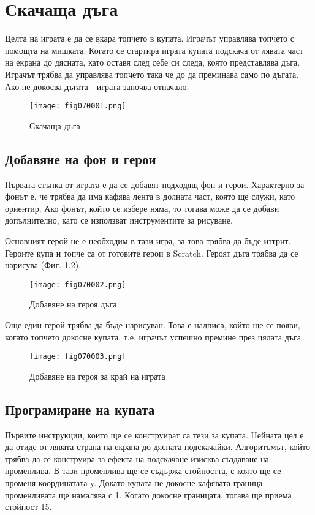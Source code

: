 \chapter{Скачаща дъга}

Целта на играта е да се вкара топчето в купата. Играчът управлява топчето с помощта на мишката. Когато се стартира играта купата подскача от лявата част на екрана до дясната, като оставя след себе си следа, която представлява дъга. Играчът трябва да управлява топчето така че до да преминава само по дъгата. Ако не докосва дъгата - играта започва отначало.

\begin{figure}[H]
  \centering
  \texttt{[image: fig070001.png]}
  \caption{Скачаща дъга}
\label{fig070001}
\end{figure}

\section{Добавяне на фон и герои}
Първата стъпка от играта е да се добавят подходящ фон и герои. Характерно за фонът е, че трябва да има кафява лента в долната част, която ще служи, като ориентир. Ако фонът, който се избере няма, то тогава може да се добави допълнително, като се използват инструментите за рисуване.

Основният герой не е необходим в тази игра, за това трябва да бъде изтрит. Героите купа и топче са от готовите герои в Scratch. Героят дъга трябва да се нарисува (Фиг. \ref{fig070002}).

\begin{figure}[H]
  \centering
  \texttt{[image: fig070002.png]}
  \caption{Добавяне на героя дъга}
\label{fig070002}
\end{figure}

Още един герой трябва да бъде нарисуван. Това е надписа, който ще се появи, когато топчето докосне купата, т.е. играчът успешно премине през цялата дъга.

\begin{figure}[H]
  \centering
  \texttt{[image: fig070003.png]}
  \caption{Добавяне на героя за край на играта}
\label{fig070003}
\end{figure}

\section{Програмиране на купата}
Първите инструкции, които ще се конструират са тези за купата. Нейната цел е да отиде от лявата страна на екрана до дясната подскачайки. Алгоритъмът, който трябва да се конструира за ефекта на подскачане изисква създаване на променлива. В тази променлива ще се съдържа стойността, с която ще се променя координатата y. Докато купата не докосне кафявата граница променливата ще намалява с 1. Когато докосне границата, тогава ще приема стойност 15.

